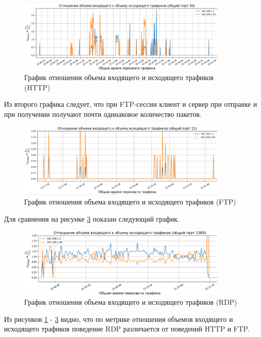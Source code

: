 \documentclass[bachelor, och, coursework]{SCWorks}
\begin{document}
\begin{figure}[H]
  \centering
  \includegraphics[width=0.9\textwidth]{pics/newhttp1.png}
  \caption{График отношения объема входящего и исходящего трафиков (HTTP)}
  \label{httpg1}
\end{figure}

Из второго графика следует, что при FTP-сессии клиент и сервер при отправке и при получении получают почти одинаковое 
количество пакетов.


\begin{figure}[H]
  \centering
  \includegraphics[width=0.9\textwidth]{pics/newftp1.png}
  \caption{График отношения объема входящего и исходящего трафиков (FTP)}
  \label{ftpg1}
\end{figure}

Для сравнения на рисунке \ref{rdpg1} показан следующий график.

\begin{figure}[H]
  \centering
  \includegraphics[width=0.9\textwidth]{pics/newrdp1.png}
  \caption{График отношения объема входящего и исходящего трафиков (RDP)}
  \label{rdpg1}
\end{figure}

Из рисунков \ref{httpg1} - \ref{rdpg1} видно, что по метрике отношения объемов входящего и исходящего трафиков поведение RDP различается
от поведений HTTP и FTP.
\end{document}
